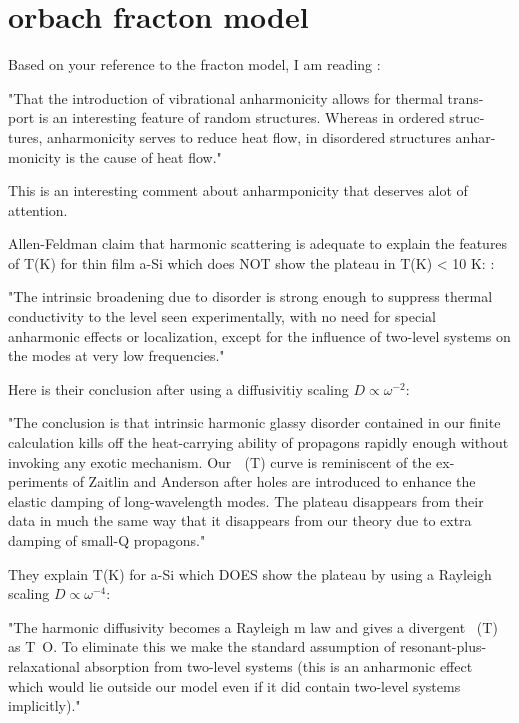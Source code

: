 \section{orbach fracton model}

Based on your reference to the fracton model, 
I am reading \cite{orbach_phonon_1993}:

"That the introduction of vibrational
anharmonicity allows for thermal trans-
port is an interesting feature of random
structures. Whereas in ordered struc-
tures, anharmonicity serves to reduce
heat flow, in disordered structures anhar-
monicity is the cause of heat flow."

This is an interesting comment about anharmponicity that deserves 
alot of attention. 

Allen-Feldman claim that harmonic scattering is adequate to explain the 
features of T(K) for thin film a-Si which does NOT show the plateau in 
T(K) < 10 K:
\cite{feldman_numerical_1999}:

"The intrinsic broadening due to disorder is strong enough to suppress
thermal conductivity to the level seen experimentally, with no need for 
special anharmonic effects or localization, except for the influence of 
two-level systems on the modes at very low frequencies."

Here is their conclusion after using a diffusivitiy scaling 
$D \propto \omega^{-2}$:

"The conclusion is that intrinsic harmonic glassy disorder
contained in our finite calculation kills off the heat-carrying
ability of propagons rapidly enough without invoking any
exotic mechanism. Our ␬ (T) curve is reminiscent of the ex-
periments of Zaitlin and Anderson after holes are introduced
to enhance the elastic damping of long-wavelength modes.
The plateau disappears from their data in much the same way
that it disappears from our theory due to extra damping of
small-Q propagons."

They explain T(K) for a-Si which DOES show the plateau by using a 
Rayleigh scaling $D \propto \omega^{-4}$:\cite{feldman_thermal_1993}

"The harmonic diffusivity becomes a Rayleigh m
law
and gives a divergent ~(T) as T~O. To eliminate this we make the standard 
assumption of resonant-plus-relaxational absorption from two-level systems 
(this is an anharmonic effect which would lie outside
our model even if it did contain two-level systems implicitly)."

